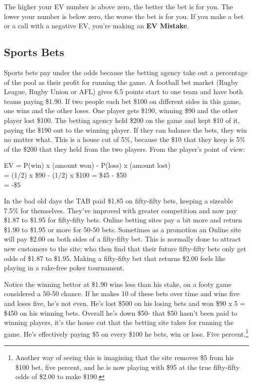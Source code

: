The higher your EV number is above zero, the better the bet is for
you. The lower your number is below zero, the worse the bet is for
you. If you make a bet or a call with a negative EV, you're making an
\textbf{EV Mistake}.

\subsection*{Sports Bets}
Sports bets pay under the odds because the betting agency take out a
percentage of the pool as their profit for running the game. A
football bet market (Rugby League, Rugby Union or AFL) gives 6.5
points start to one team and have both teams paying \$1.90. If two
people each bet \$100 on different sides in this game, one wins and
the other loses. One player gets \$190, winning \$90 and the other
player lost \$100. The betting agency held \$200 on the game and kept
\$10 of it, paying the \$190 out to the winning player. If they can
balance the bets, they win no matter what. This is a house cut of 5\%,
because the \$10 that they keep is 5\% of the \$200 that they held from
the two players. From the player's point of view:

EV = P(win) x (amount won) - P(loss) x (amount lost) \\
   = (1/2) x \$90 - (1/2) x \$100  = \$45 - \$50  \\
   = -\$5

In the bad old days
the TAB paid \$1.85 on fifty-fifty bets, keeping a sizeable 7.5\% for
themselves. They've improved with greater competition and now pay
\$1.87 to \$1.95 for fifty-fifty bets. Online betting sites pay a bit
more and return \$1.90 to \$1.95 or more for 50-50 bets. Sometimes as
a promotion an Online site will pay \$2.00 on both sides of a
fifty-fifty bet. This is normally done to attract new customers to the
site; who then find that their future fifty-fifty bets only get odds
of \$1.87 to \$1.95. Making a fifty-fifty bet that returns \$2.00 feels like
playing in a rake-free poker tournament.


Notice the winning bettor at \$1.90 wins less than his stake,
on a footy game considered a 50-50 chance. If he makes 10 of these
bets over time and wins five and loses five, he's not even. He's lost
\$500 on his losing bets and won \$90 x 5 = \$450 on his winning bets.
Overall he's down \$50- that \$50 hasn't been paid to winning players,
it's the house cut that the betting site takes for running the game.
He's effectively paying \$5 on every \$100 he bets, win or lose.
Five percent.\footnote{Another way of seeing this is imagining that the
site removes \$5 from his \$100 bet, five percent, and he is now
playing with \$95 at the true fifty-fifty odds of \$2.00 to make \$190.}

